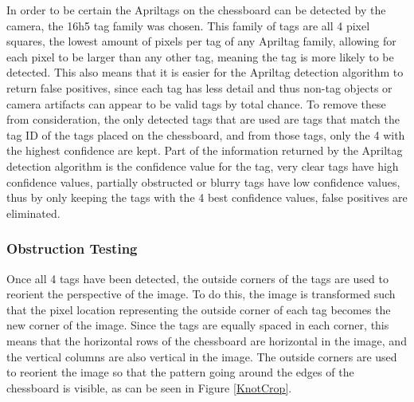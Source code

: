 \documentclass[journal]{IEEEtran}
\begin{document}
In order to be certain the Apriltags on the chessboard can be detected by the camera, the 16h5 tag family was chosen. This family of tags are all 4 pixel squares, the lowest amount of pixels per tag of any Apriltag family, allowing for each pixel to be larger than any other tag, meaning the tag is more likely to be detected.
This also means that it is easier for the Apriltag detection algorithm to return false positives, since each tag has less detail and thus non-tag objects or camera artifacts can appear to be valid tags by total chance. To remove these from consideration, the only detected tags that are used are tags that match the tag ID of the tags placed on the chessboard, and from those tags, only the 4 with the highest confidence are kept. Part of the information returned by the Apriltag detection algorithm is the confidence value for the tag, very clear tags have high confidence values, partially obstructed or blurry tags have low confidence values, thus by only keeping the tags with the 4 best confidence values, false positives are eliminated.

\vspace{12pt}

\subsubsection{Obstruction Testing}
\label{KnotDetection}

Once all 4 tags have been detected, the outside corners of the tags are used to reorient the perspective of the image. To do this, the image is transformed such that the pixel location representing the outside corner of each tag becomes the new corner of the image. Since the tags are equally spaced in each corner, this means that the horizontal rows of the chessboard are horizontal in the image, and the vertical columns are also vertical in the image. The outside corners are used to reorient the image so that the pattern going around the edges of the chessboard is visible, as can be seen in Figure \ref{KnotCrop}. 
\end{document}

